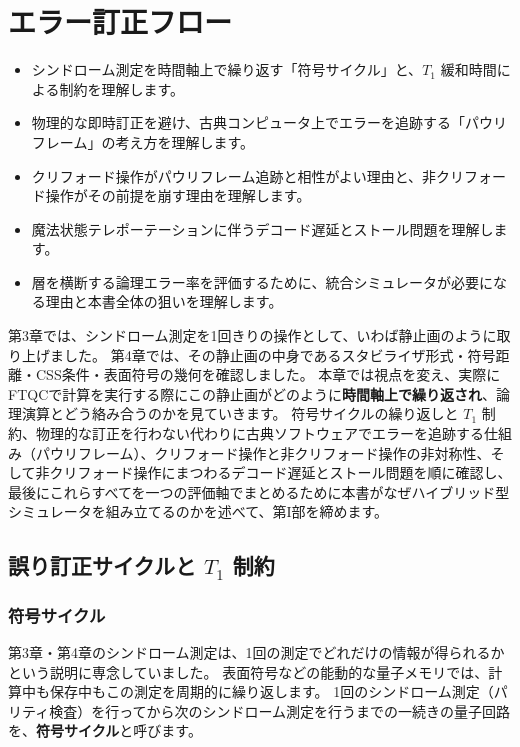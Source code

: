 \chapter{エラー訂正フロー}\label{ch:qec_flow}

\begin{chaptergoal}
  \begin{itemize}
  \item シンドローム測定を時間軸上で繰り返す「符号サイクル」と、$T_1$ 緩和時間による制約を理解します。
  \item 物理的な即時訂正を避け、古典コンピュータ上でエラーを追跡する「パウリフレーム」の考え方を理解します。
  \item クリフォード操作がパウリフレーム追跡と相性がよい理由と、非クリフォード操作がその前提を崩す理由を理解します。
  \item 魔法状態テレポーテーションに伴うデコード遅延とストール問題を理解します。
  \item 層を横断する論理エラー率を評価するために、統合シミュレータが必要になる理由と本書全体の狙いを理解します。
  \end{itemize}
\end{chaptergoal}

第3章では、シンドローム測定を1回きりの操作として、いわば静止画のように取り上げました。
第4章では、その静止画の中身であるスタビライザ形式・符号距離・CSS条件・表面符号の幾何を確認しました。
本章では視点を変え、実際にFTQCで計算を実行する際にこの静止画がどのように\textbf{時間軸上で繰り返され}、論理演算とどう絡み合うのかを見ていきます。
符号サイクルの繰り返しと $T_1$ 制約、物理的な訂正を行わない代わりに古典ソフトウェアでエラーを追跡する仕組み（パウリフレーム）、クリフォード操作と非クリフォード操作の非対称性、そして非クリフォード操作にまつわるデコード遅延とストール問題を順に確認し、最後にこれらすべてを一つの評価軸でまとめるために本書がなぜハイブリッド型シミュレータを組み立てるのかを述べて、第I部を締めます。

\section{誤り訂正サイクルと \texorpdfstring{$T_1$}{T1} 制約}\label{sec:cycle_t1}

\subsection{符号サイクル}

第3章・第4章のシンドローム測定は、1回の測定でどれだけの情報が得られるかという説明に専念していました。
表面符号などの能動的な量子メモリでは、計算中も保存中もこの測定を周期的に繰り返します。
1回のシンドローム測定（パリティ検査）を行ってから次のシンドローム測定を行うまでの一続きの量子回路を、\textbf{符号サイクル}と呼びます。

